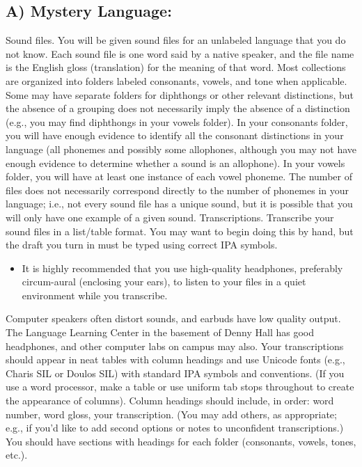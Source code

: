 \documentclass[12pt]{article}
\begin{document}
\subsection*{A) Mystery Language:}
Sound files.  You will be given sound files for an unlabeled language that you do not know.
Each sound file is one word said by a native speaker, and the file name is the English gloss (translation) for the meaning of that word.
Most collections are organized into folders labeled consonants, vowels, and tone when applicable.  Some may have separate folders for diphthongs or other relevant distinctions, but the absence of a grouping does not necessarily imply the absence of a distinction (e.g., you may find diphthongs in your vowels folder).  In your consonants folder, you will have enough evidence to identify all the consonant distinctions in your language (all phonemes and possibly some allophones, although you may not have enough evidence to determine whether a sound is an allophone).  In your vowels folder, you will have at least one instance of each vowel phoneme.
The number of files does not necessarily correspond directly to the number of phonemes in your language; i.e., not every sound file has a unique sound, but it is possible that you will only have one example of a given sound.
Transcriptions.  Transcribe your sound files in a list/table format.  You may want to begin doing this by hand, but the draft you turn in must be typed using correct IPA symbols.
\begin{itemize}
  \item It is highly recommended that you use high-quality headphones, preferably circum-aural (enclosing your ears), to listen to your files in a quiet environment while you transcribe.
\end{itemize}
Computer speakers often distort sounds, and earbuds have low quality output.  The Language Learning Center in the basement of Denny Hall has good headphones, and other computer labs on campus may also.
Your transcriptions should appear in neat tables with column headings and use Unicode fonts (e.g., Charis SIL or Doulos SIL) with standard IPA symbols and conventions.  (If you use a word processor, make a table or use uniform tab stops throughout to create the appearance of columns).
Column headings should include, in order: word number, word gloss, your transcription.  (You may add others, as appropriate; e.g., if you’d like to add second options or notes to unconfident transcriptions.)
You should have sections with headings for each folder (consonants, vowels, tones, etc.).
\end{document}
